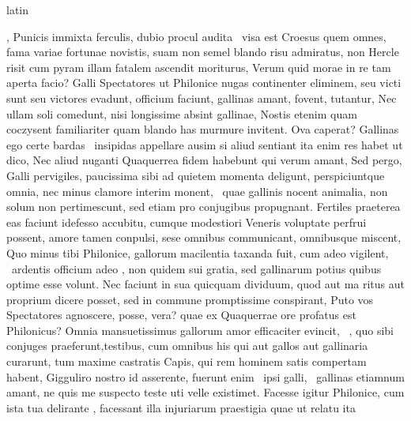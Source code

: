 \documentclass[12pt]{book}
\renewenvironment{latin}
    	{\begin{hyphenrules}{latin}}
    	{\end{hyphenrules}}
\begin{document}
\begin{pages}
\begin{latin}
\begin{Leftside}
                  , Punicis immixta ferculis, dubio procul audita  \ampersand\ visa est Croesus 
                  quem omnes, fama variae fortunae novistis, suam  non semel blando risu admiratus, 
                  non Hercle risit cum pyram illam fatalem ascendit moriturus, Verum quid  morae in re tam aperta facio? Galli Spectatores ut Philonice nugas continenter eliminem, 
                  seu victi sunt seu victores evadunt, officium faciunt, gallinas amant, fovent, tutantur, Nec ullam  soli comedunt, 
                  nisi longissime absint gallinae, Nostis etenim quam coczysent familiariter quam blando has murmure invitent. Ova caperat? Gallinas ego certe bardas  \ampersand\ insipidas appellare ausim si aliud
                  sentiant ita enim res habet ut dico, Nec aliud nuganti Quaquerrea fidem habebunt qui verum amant, Sed pergo, Galli pervigiles, paucissima sibi ad quietem  momenta deligunt,
                  perspiciuntque omnia, nec minus clamore interim monent,  \ampersand\ quae gallinis nocent animalia, non solum non pertimescunt, sed etiam pro conjugibus propugnant.
                  Fertiles praeterea eas faciunt idefesso accubitu, cumque modestiori Veneris voluptate perfrui possent, amore tamen conpulsi, sese omnibus communicant, omnibusque miscent,
                  Quo minus tibi Philonice, gallorum macilentia taxanda fuit, cum adeo vigilent,  \ampersand\ ardentis  officium adeo , 
                  non quidem sui gratia, sed gallinarum potius quibus optime esse volunt. Nec faciunt in sua  quicquam dividuum,
                  quod aut ma ritus aut  proprium dicere posset, sed in commune promptissime conspirant, 
                  Puto vos Spectatores agnoscere, posse,  vera? quae ex Quaquerrae ore profatus est Philonicus? 
                  Omnia mansuetissimus gallorum amor efficaciter evincit,  \ampersand\ , quo sibi conjuges praeferunt,testibus,
                  cum omnibus his qui aut gallos aut gallinaria  curarunt, tum maxime castratis Capis,
                  qui rem hominem satis compertam habent, Gigguliro nostro id asserente, fuerunt enim  \ampersand\ ipsi galli,  \ampersand\ gallinas etiamnum amant, ne quis me suspecto teste uti velle existimet.
                  Facesse igitur Philonice, cum ista tua delirante , facessant illa injuriarum praestigia quae ut relatu ita  \ampersand\

\end{Leftside}
\end{latin}
\end{pages}
\end{document}
